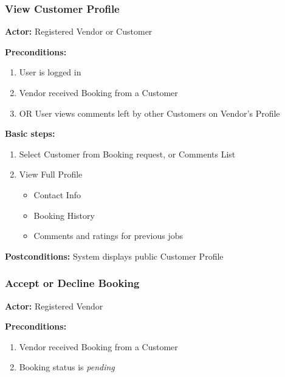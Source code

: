 \documentclass[11pt,a4paper]{article}
\begin{document}
\subsubsection{View Customer Profile}

\textbf{Actor:} Registered Vendor or Customer

\noindent \textbf{Preconditions:}
\begin{enumerate}
  \item User is logged in
  \item Vendor received Booking from a Customer
  \item OR User views comments left by other Customers on Vendor's Profile
\end{enumerate}

\noindent \textbf{Basic steps:}
\begin{enumerate}
  \item Select Customer from Booking request, or Comments List
  \item View Full Profile
    \begin{itemize}
      \item Contact Info
      \item Booking History
      \item Comments and ratings for previous jobs
    \end{itemize}
\end{enumerate}

\noindent \textbf{Postconditions:} System displays public Customer Profile

\subsubsection{Accept or Decline Booking}

\textbf{Actor:} Registered Vendor

\noindent \textbf{Preconditions:}
\begin{enumerate}
  \item Vendor received Booking from a Customer
  \item Booking status is \textit{pending}
\end{enumerate}
\end{document}
